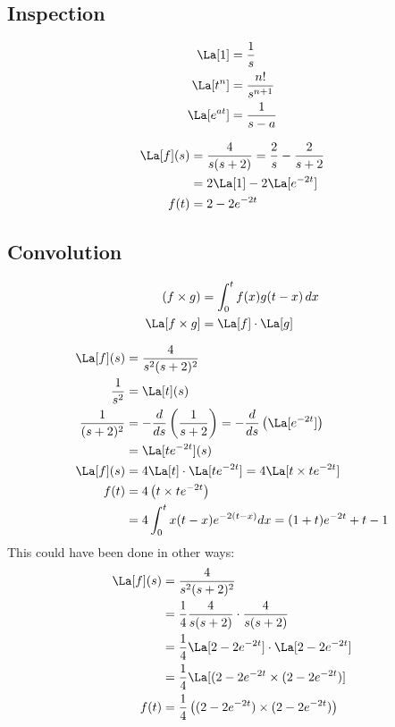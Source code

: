 \documentclass[cplx.tex]{subfiles}
\begin{document}
\subsection{Inspection}
\begin{align}
    \La[1] &= \frac1s \\
    \La[t^n] &= \frac{n!}{s^{n+1}} \\
    \La[e^{at}] &= \frac{1}{s-a}
\end{align}

\begin{example}
\begin{align}
    \La[f](s) &= \frac{4}{s(s+2)} = \frac2s - \frac{2}{s+2} \\
              &= 2\La[1] - 2\La[e^{-2t}] \\
    f(t) &= 2-2e^{-2t}
\end{align}
\end{example}

\subsection{Convolution}
\begin{align}
    (f\times g) &= \int_0^t f(x)g(t-x)\,dx \\
    \La[f\times g] &= \La[f]\cdot\La[g]
\end{align}

\begin{example}
\begin{align}
    \La[f](s) &= \frac{4}{s^2(s+2)^2} \\
    \frac{1}{s^2} &= \La[t](s) \\
    \frac{1}{(s+2)^2} &= -\frac{d}{ds}\left(\frac{1}{s+2}\right) = -\frac{d}{ds}\left(\La[e^{-2t}]\right) \\
                      &= \La[te^{-2t}](s) \\
    \La[f](s) &= 4\La[t]\cdot\La[te^{-2t}] = 4\La[t\times te^{-2t}] \\
    f(t) &= 4\left(t\times te^{-2t}\right) \\
         &= 4\int_0^t x(t-x)e^{-2(t-x)}dx = (1+t)e^{-2t} + t - 1
\end{align}
This could have been done in other ways:
\begin{align}
    \La[f](s) &= \frac{4}{s^2(s+2)^2} \\
              &= \frac14 \frac{4}{s(s+2)} \cdot \frac{4}{s(s+2)} \\
              &= \frac14 \La[2-2e^{-2t}]\cdot\La[2-2e^{-2t}] \\
              &= \frac14 \La[(2-2e^{-2t}\times(2-2e^{-2t})] \\
    f(t) &= \frac14 \left((2-2e^{-2t})\times(2-2e^{-2t})\right)
\end{align}
\end{example}
\end{document}
